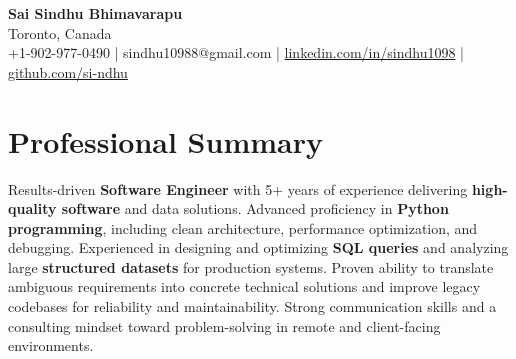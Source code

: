 \documentclass[letterpaper,11pt]{article}
\begin{document}
\begin{center}
  {\Large \textbf{Sai Sindhu Bhimavarapu}} \\
  Toronto, Canada \\
  +1-902-977-0490 \enspace | \enspace sindhu10988@gmail.com \enspace | \enspace \href{https://www.linkedin.com/in/sindhu1098/}{linkedin.com/in/sindhu1098} \enspace | \enspace \href{https://github.com/si-ndhu}{github.com/si-ndhu}
\end{center}

\section{Professional Summary}
  \begin{itemize}[leftmargin=0.15in, label={}]
    \small{\item{
     Results-driven \textbf{Software Engineer} with 5+ years of experience delivering \textbf{high-quality software} and data solutions. Advanced proficiency in \textbf{Python programming}, including clean architecture, performance optimization, and debugging. Experienced in designing and optimizing \textbf{SQL queries} and analyzing large \textbf{structured datasets} for production systems. Proven ability to translate ambiguous requirements into concrete technical solutions and improve legacy codebases for reliability and maintainability. Strong communication skills and a consulting mindset toward problem-solving in remote and client-facing environments.
    }}
  \end{itemize}
\vspace{-16pt}

\end{document}
